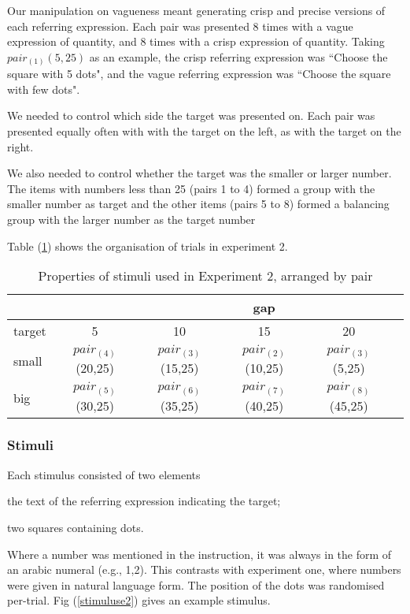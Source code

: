 \documentclass[doc,floatmark]{apa}
\begin{document}
Our manipulation on vagueness meant generating crisp and precise versions of each referring expression. Each pair was presented 8 times with a vague expression of quantity, and 8 times with a crisp expression of quantity. Taking $pair_{(1)}(5,25)$ as an example, the crisp referring expression was ``Choose the square with 5 dots", and the vague referring expression was ``Choose the square with few dots".

We needed to control which side the target was presented on. Each pair was presented equally often with with the target on the left, as with the target on the right.

We also needed to control whether the target was the smaller or larger number. The items with numbers less than 25 (pairs 1 to 4) formed a group with the smaller number as target and the other items (pairs 5 to 8) formed a balancing group with the larger number as the target number

Table (\ref{tablee2}) shows the organisation of trials in experiment 2.

\begin{table}[tbp]
\caption{Properties of stimuli used in Experiment 2, arranged by pair}
\label{tablee2}
\begin{tabular}{lccccl}
&&&gap&&\\
\hline
target&5&10&15&20\\
\hline
	small&		$pair_{(4)}$(20,25)&$pair_{(3)}$(15,25)&$pair_{(2)}$(10,25)&$pair_{(3)}$(5,25)\\
 	big     &		$pair_{(5)}$(30,25)&$pair_{(6)}$(35,25)&$pair_{(7)}$(40,25)&$pair_{(8)}$(45,25)\\
\end{tabular}
\end{table}

\subsubsection{Stimuli}

Each stimulus consisted of two elements \begin{seriate} \item the text of the referring expression indicating the target; \item two squares containing dots. \end{seriate} Where a number was mentioned in the instruction, it was always in the form of an arabic numeral (e.g., 1,2). This contrasts with experiment one, where numbers were given in natural language form. The position of the dots was randomised per-trial.
Fig (\ref{stimuluse2}) gives an example stimulus.
\end{document}
